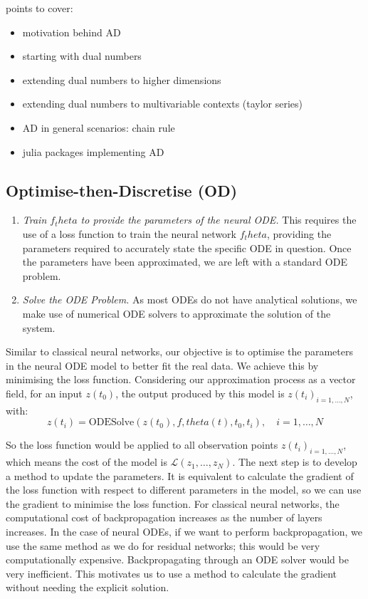 \documentclass[a4paper,11pt,titlepage]{article}
\def\theta{theta}%
\theoremstyle{definition}
\theoremstyle{plain}
\theoremstyle{remark}
\begin{document}
points to cover:
\begin{itemize}
    \item motivation behind AD
    \item starting with dual numbers
    \item extending dual numbers to higher dimensions
    \item extending dual numbers to multivariable contexts (taylor series)
    \item AD in general scenarios: chain rule
    \item julia packages implementing AD
\end{itemize}

\subsection{Optimise-then-Discretise (OD)}
\label{sec:od}

\begin{enumerate}
    \item \textit{Train $f_\theta$ to provide the parameters of the neural ODE.} This requires the use of a loss function to train the neural network $f_\theta$, providing the parameters required to accurately state the specific ODE in question. Once the parameters have been approximated, we are left with a standard ODE problem.
    \item \textit{Solve the ODE Problem.} As most ODEs do not have analytical solutions, we make use of numerical ODE solvers to approximate the solution of the system.
\end{enumerate}

Similar to classical neural networks, our objective is to optimise the parameters in the neural ODE model to better fit the real data. We achieve this by minimising the loss function. Considering our approximation process as a vector field, for an input
$z(t_0)$, the output produced by this model is $z(t_i)_{i=1,\dots,N}$, with:
$$z(t_i)=\mathrm{ODESolve}(z(t_0),f,\theta(t),t_0,t_i),\quad i=1,\dots,N$$

So the loss function would be applied to all observation points $z(t_i)_{i=1,\dots,N}$, which means the cost of the model is $\mathcal{L}(z_1,\dots,z_N)$. The next step is to develop a method to update the parameters. It is equivalent to calculate the gradient of the loss function with respect to different parameters in the model, so we can use the gradient to minimise the loss function. For classical neural networks, the computational cost of backpropagation increases as the number of layers increases. In the case of neural ODEs, if we want to perform backpropagation, we use the same method as we do for residual networks; this would be very computationally expensive. Backpropagating through an ODE solver would be very inefficient. This motivates us to use a method to calculate the gradient without needing the explicit solution.
\end{document}
